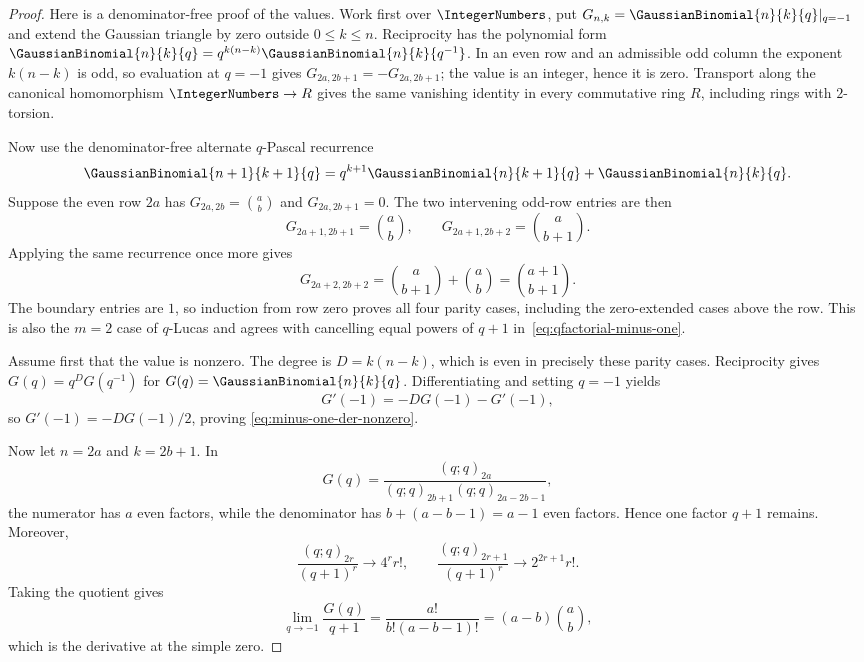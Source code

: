 \documentclass[11pt,oneside]{article}
\theoremstyle{definition}
\theoremstyle{remark}
\begin{document}
\begin{proof}
Here is a denominator-free proof of the values.  Work first over $\IntegerNumbers$, put
$G_{n,k}=\GaussianBinomial{n}{k}{q}|_{q=-1}$ and extend the Gaussian triangle by zero outside
$0\leq k\leq n$.  Reciprocity has the polynomial form
$\GaussianBinomial{n}{k}{q}=q^{k(n-k)}\GaussianBinomial{n}{k}{q^{-1}}$.  In an even row and an
admissible odd column the exponent $k(n-k)$ is odd, so evaluation at $q=-1$ gives
$G_{2a,2b+1}=-G_{2a,2b+1}$; the value is an integer, hence it is zero.
Transport along the canonical homomorphism $\IntegerNumbers\to R$ gives the same vanishing
identity in every commutative ring $R$, including rings with $2$-torsion.

Now use the denominator-free alternate $q$-Pascal recurrence
\[
 \GaussianBinomial{n+1}{k+1}{q}
 =q^{k+1}\GaussianBinomial{n}{k+1}{q}+\GaussianBinomial{n}{k}{q}.
\]
Suppose the even row $2a$ has
$G_{2a,2b}=\binom ab$ and $G_{2a,2b+1}=0$.  The two intervening odd-row
entries are then
\[
 G_{2a+1,2b+1}=\binom ab,
 \qquad
 G_{2a+1,2b+2}=\binom a{b+1}.
\]
Applying the same recurrence once more gives
\[
 G_{2a+2,2b+2}
 =\binom a{b+1}+\binom ab
 =\binom{a+1}{b+1}.
\]
The boundary entries are $1$, so induction from row zero proves all four
parity cases, including the zero-extended cases above the row.  This is also
the $m=2$ case of $q$-Lucas and agrees with cancelling equal powers of $q+1$
in~\eqref{eq:qfactorial-minus-one}.

Assume first that the value is nonzero.  The degree is
$D=k(n-k)$, which is even in precisely these parity cases.  Reciprocity gives
$G(q)=q^DG(q^{-1})$ for $G(q)=\GaussianBinomial{n}{k}{q}$.  Differentiating and setting
$q=-1$ yields
\[
 G'(-1)=-DG(-1)-G'(-1),
\]
so $G'(-1)=-DG(-1)/2$, proving
\eqref{eq:minus-one-der-nonzero}.

Now let $n=2a$ and $k=2b+1$.  In
\[
 G(q)=\frac{(q;q)_{2a}}
 {(q;q)_{2b+1}(q;q)_{2a-2b-1}},
\]
the numerator has $a$ even factors, while the denominator has
$b+(a-b-1)=a-1$ even factors.  Hence one factor $q+1$ remains.  Moreover,
\[
 \frac{(q;q)_{2r}}{(q+1)^r}\longrightarrow 4^r r!,
 \qquad
 \frac{(q;q)_{2r+1}}{(q+1)^r}\longrightarrow 2^{2r+1}r!.
\]
Taking the quotient gives
\[
 \lim_{q\to-1}\frac{G(q)}{q+1}
 =\frac{a!}{b!(a-b-1)!}
 =(a-b)\binom ab,
\]
which is the derivative at the simple zero.
\end{proof}
\end{document}

